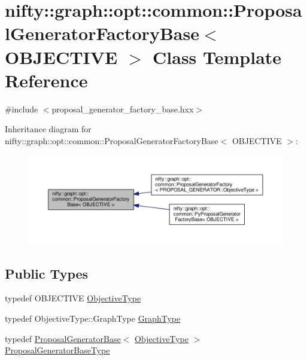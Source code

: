 \hypertarget{classnifty_1_1graph_1_1opt_1_1common_1_1ProposalGeneratorFactoryBase}{}\section{nifty\+:\+:graph\+:\+:opt\+:\+:common\+:\+:Proposal\+Generator\+Factory\+Base$<$ O\+B\+J\+E\+C\+T\+I\+VE $>$ Class Template Reference}
\label{classnifty_1_1graph_1_1opt_1_1common_1_1ProposalGeneratorFactoryBase}


{\ttfamily \#include $<$proposal\+\_\+generator\+\_\+factory\+\_\+base.\+hxx$>$}



Inheritance diagram for nifty\+:\+:graph\+:\+:opt\+:\+:common\+:\+:Proposal\+Generator\+Factory\+Base$<$ O\+B\+J\+E\+C\+T\+I\+VE $>$\+:
\nopagebreak
\begin{figure}[H]
\begin{center}
\leavevmode
\includegraphics[width=350pt]{classnifty_1_1graph_1_1opt_1_1common_1_1ProposalGeneratorFactoryBase__inherit__graph}
\end{center}
\end{figure}
\subsection*{Public Types}
\begin{DoxyCompactItemize}
\item 
typedef O\+B\+J\+E\+C\+T\+I\+VE \hyperlink{classnifty_1_1graph_1_1opt_1_1common_1_1ProposalGeneratorFactoryBase_abb308b47da6f89126f786b394be0efc5}{Objective\+Type}
\item 
typedef Objective\+Type\+::\+Graph\+Type \hyperlink{classnifty_1_1graph_1_1opt_1_1common_1_1ProposalGeneratorFactoryBase_ab4c28c6e8dd7fa7616c704a8bcc7dfdc}{Graph\+Type}
\item 
typedef \hyperlink{classnifty_1_1graph_1_1opt_1_1common_1_1ProposalGeneratorBase}{Proposal\+Generator\+Base}$<$ \hyperlink{classnifty_1_1graph_1_1opt_1_1common_1_1ProposalGeneratorFactoryBase_abb308b47da6f89126f786b394be0efc5}{Objective\+Type} $>$ \hyperlink{classnifty_1_1graph_1_1opt_1_1common_1_1ProposalGeneratorFactoryBase_a262cfc7056a43871e15130dd4435dee7}{Proposal\+Generator\+Base\+Type}
\end{DoxyCompactItemize}
